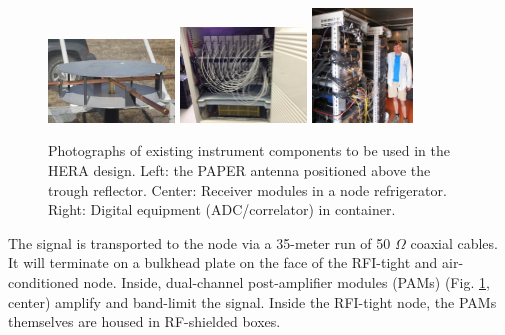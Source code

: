 \documentclass[preprint]{aastex}
\begin{document}
\begin{figure}[h]
	\centering
		\includegraphics[width=0.3\textwidth]{plots/new_antenna_closeup.jpg}
		\includegraphics[width=0.3\textwidth]{plots/Engineering/recv_node.png}
		\includegraphics[width=0.24\textwidth]{plots/Engineering/digital.png}
	\caption{Photographs of existing instrument components to be used in the HERA design.
    Left: the PAPER antenna positioned above the trough reflector.
    Center: Receiver modules in a node refrigerator.
    Right: Digital equipment (ADC/correlator) in container.}\label{fig:components}
\end{figure}

The signal is transported to the node via a 35-meter run of 50 $\Omega$ coaxial
cables. It will terminate on a bulkhead plate on the face of the RFI-tight and
air-conditioned node. Inside, dual-channel post-amplifier modules (PAMs) (Fig.
\ref{fig:components}, center) amplify and band-limit the signal. Inside the RFI-tight node,
the PAMs themselves are housed in RF-shielded boxes.
\end{document}
